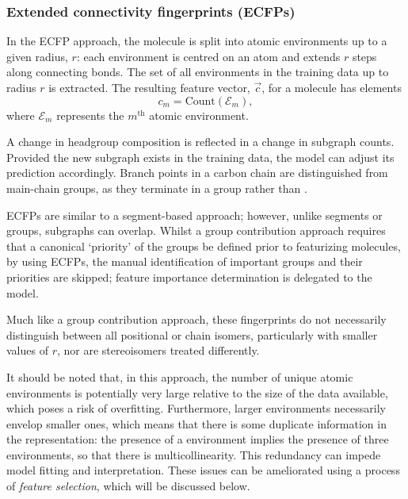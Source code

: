 \subsubsection{Extended connectivity fingerprints (ECFPs)}

In the ECFP approach, the molecule is split into atomic environments up to a
given radius, $r$: each environment is centred on an atom and extends $r$ steps
along connecting bonds. The set of all environments in the training data up to
radius $r$ is extracted. The resulting feature vector, $\vec{c}$, for a molecule
has elements
\begin{equation}
    \label{eq:ecfp}
    c_m = \text{Count}(\mathcal{E}_m),
\end{equation}
where $\mathcal{E}_m$ represents the $m^\text{th}$ atomic environment.

A change in headgroup composition is reflected in a change in subgraph counts.
Provided the new subgraph exists in the training data, the model can adjust its
prediction accordingly. Branch points in a carbon chain are distinguished from
main-chain groups, as they terminate in a  group rather than .

ECFPs are similar to a segment-based approach; however, unlike segments or
groups, subgraphs can overlap. Whilst a group contribution approach requires
that a canonical `priority' of the groups be defined prior to featurizing
molecules, by using ECFPs, the manual identification of important groups and
their priorities are skipped; feature importance determination is delegated to
the model.

Much like a group contribution approach, these fingerprints do not necessarily
distinguish between all positional or chain isomers, particularly with smaller
values of $r$, nor are stereoisomers treated differently.

It should be noted that, in this approach, the number of unique atomic
environments is potentially very large relative to the size of the data
available, which poses a risk of overfitting. Furthermore, larger environments
necessarily envelop smaller ones, which means that there is some duplicate
information in the representation: the presence of a  environment
implies the presence of three  environments, so that there is
multicollinearity. This redundancy can impede model fitting and interpretation.
These issues can be ameliorated using a process of \emph{feature selection},
which will be discussed below.

